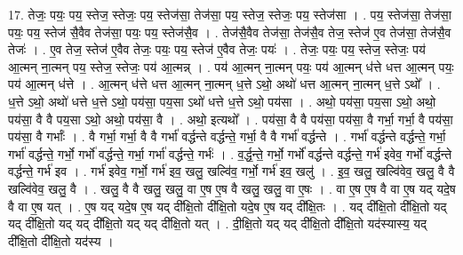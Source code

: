 \documentclass[17pt]{extarticle}
\begin{document}
17. तेजः॒ पयः॒ पय॒ स्तेज॒ स्तेजः॒ पय॒ स्तेज॑सा॒ तेज॑सा॒ पय॒ स्तेज॒ स्तेजः॒ पय॒ स्तेज॑सा । . पय॒ स्तेज॑सा॒ तेज॑सा॒ पयः॒ पय॒ स्तेज॑ सै॒वैव तेज॑सा॒ पयः॒ पय॒ स्तेज॑सै॒व । . तेज॑सै॒वैव तेज॑सा॒ तेज॑सै॒व तेज॒ स्तेज॑ ए॒व तेज॑सा॒ तेज॑सै॒व तेजः॑ । . ए॒व तेज॒ स्तेज॑ ए॒वैव तेजः॒ पयः॒ पय॒ स्तेज॑ ए॒वैव तेजः॒ पयः॑ । . तेजः॒ पयः॒ पय॒ स्तेज॒ स्तेजः॒ पय॑ आ॒त्मन् ना॒त्मन् पय॒ स्तेज॒ स्तेजः॒ पय॑ आ॒त्मन्न् । . पय॑ आ॒त्मन् ना॒त्मन् पयः॒ पय॑ आ॒त्मन् ध॑त्ते धत्त आ॒त्मन् पयः॒ पय॑ आ॒त्मन् ध॑त्ते । . आ॒त्मन् ध॑त्ते धत्त आ॒त्मन् ना॒त्मन् ध॒त्ते ऽथो॒ अथो॑ धत्त आ॒त्मन् ना॒त्मन् ध॒त्ते ऽथो᳚ । . ध॒त्ते ऽथो॒ अथो॑ धत्ते ध॒त्ते ऽथो॒ पय॑सा॒ पय॒सा ऽथो॑ धत्ते ध॒त्ते ऽथो॒ पय॑सा । . अथो॒ पय॑सा॒ पय॒सा ऽथो॒ अथो॒ पय॑सा॒ वै वै पय॒सा ऽथो॒ अथो॒ पय॑सा॒ वै । . अथो॒ इत्यथो᳚ । . पय॑सा॒ वै वै पय॑सा॒ पय॑सा॒ वै गर्भा॒ गर्भा॒ वै पय॑सा॒ पय॑सा॒ वै गर्भाः᳚ । . वै गर्भा॒ गर्भा॒ वै वै गर्भा॑ वर्द्धन्ते वर्द्धन्ते॒ गर्भा॒ वै वै गर्भा॑ वर्द्धन्ते । . गर्भा॑ वर्द्धन्ते वर्द्धन्ते॒ गर्भा॒ गर्भा॑ वर्द्धन्ते॒ गर्भो॒ गर्भो॑ वर्द्धन्ते॒ गर्भा॒ गर्भा॑ वर्द्धन्ते॒ गर्भः॑ । . व॒र्द्ध॒न्ते॒ गर्भो॒ गर्भो॑ वर्द्धन्ते वर्द्धन्ते॒ गर्भ॑ इवेव॒ गर्भो॑ वर्द्धन्ते वर्द्धन्ते॒ गर्भ॑ इव । . गर्भ॑ इवेव॒ गर्भो॒ गर्भ॑ इव॒ खलु॒ खल्वि॑व॒ गर्भो॒ गर्भ॑ इव॒ खलु॑ । . इ॒व॒ खलु॒ खल्वि॑वेव॒ खलु॒ वै वै खल्वि॑वेव॒ खलु॒ वै । . खलु॒ वै वै खलु॒ खलु॒ वा ए॒ष ए॒ष वै खलु॒ खलु॒ वा ए॒षः । . वा ए॒ष ए॒ष वै वा ए॒ष यद् यदे॒ष वै वा ए॒ष यत् । . ए॒ष यद् यदे॒ष ए॒ष यद् दी᳚क्षि॒तो दी᳚क्षि॒तो यदे॒ष ए॒ष यद् दी᳚क्षि॒तः । . यद् दी᳚क्षि॒तो दी᳚क्षि॒तो यद् यद् दी᳚क्षि॒तो यद् यद् दी᳚क्षि॒तो यद् यद् दी᳚क्षि॒तो यत् । . दी॒क्षि॒तो यद् यद् दी᳚क्षि॒तो दी᳚क्षि॒तो यद॑स्यास्य॒ यद् दी᳚क्षि॒तो दी᳚क्षि॒तो यद॑स्य । \newline
\end{document}
